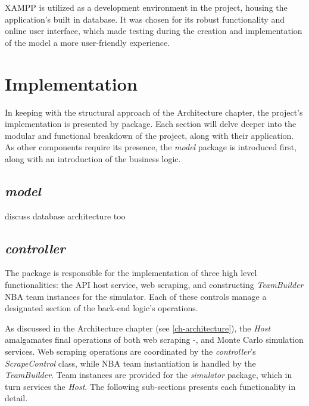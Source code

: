 \documentclass{thesis-ekf}
\theoremstyle{definition}
\theoremstyle{remark}
\begin{document}
XAMPP is utilized as a development environment in the project, housing the application's built in database. It was chosen for its robust functionality and online user interface, which made testing during the creation and implementation of the model a more user-friendly experience. 


\chapter{Implementation}
In keeping with the structural approach of the Architecture chapter, the project's implementation is presented by package. Each section will delve deeper into the modular and functional breakdown of the project, along with their application. As other components require its presence, the \emph{model} package is introduced first, along with an introduction of the business logic.

\section{\emph{model}}
discuss database architecture too



\section{\emph{controller}}
The package is responsible for the implementation of three high level functionalities: the API host service, web scraping, and constructing \emph{TeamBuilder} NBA team instances for the simulator. Each of these controls manage a designated section of the back-end logic's operations. 

As discussed in the Architecture chapter (see \ref{ch-architecture}), the \emph{Host} amalgamates final operations of both web scraping -, and Monte Carlo simulation services. Web scraping operations are coordinated by the \emph{controller}'s \emph{ScrapeControl} class, while NBA team instantiation is handled by the \emph{TeamBuilder}. Team instances are provided for the \emph{simulator} package, which in turn services the \emph{Host}. The following sub-sections presents each functionality in detail.
\end{document}
